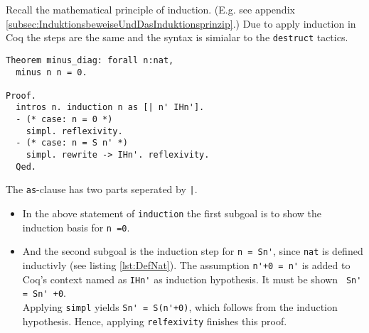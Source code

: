 Recall the mathematical principle of induction. (E.g. see appendix \ref{subsec:InduktionsbeweiseUndDasInduktionsprinzip}.)
Due to apply induction in Coq the steps are the same and the syntax is simialar to the \lstinline!destruct! tactics.
 

\begin{lstlisting}[caption = \lstinline!minus_diag!, label =lst:minus_diag] 
Theorem minus_diag: forall n:nat,
  minus n n = 0.
  
Proof.
  intros n. induction n as [| n' IHn'].
  - (* case: n = 0 *)
    simpl. reflexivity.
  - (* case: n = S n' *)
    simpl. rewrite -> IHn'. reflexivity.  
  Qed.
\end{lstlisting}

The \lstinline!as!-clause has two parts seperated by \lstinline!|!.
\begin{itemize}
	\item In the above statement of \lstinline!induction! the first subgoal is to show the induction basis for \lstinline!n =0!.
	\item And the second subgoal is the induction step for \lstinline!n = Sn'!, since \lstinline!nat! is defined inductivly (see listing  \ref{lst:DefNat}).
	      The assumption \lstinline!n'+0 = n'! is added to Coq's context named as \lstinline!IHn'! as induction hypothesis.
		  It must be shown \lstinline! Sn' = Sn' +0!. \\
          Applying \lstinline!simpl! yields \lstinline!Sn' = S(n'+0)!, which follows from the induction hypothesis. 
          Hence, applying \lstinline!relfexivity! finishes this proof.
\end{itemize} 




